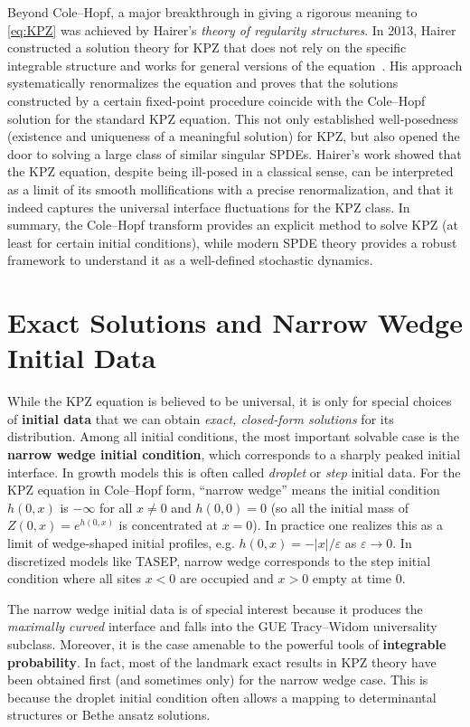\documentclass[letterpaper,11pt,oneside,reqno]{article}
\numberwithin{equation}{section}
\theoremstyle{definition}
\begin{document}
Beyond Cole–Hopf, a major breakthrough in giving a rigorous meaning to \eqref{eq:KPZ} was achieved by Hairer’s \emph{theory of regularity structures}. In 2013, Hairer constructed a solution theory for KPZ that does not rely on the specific integrable structure and works for general versions of the equation \cite{Hairer11}. His approach systematically renormalizes the equation and proves that the solutions constructed by a certain fixed-point procedure coincide with the Cole–Hopf solution for the standard KPZ equation. This not only established well-posedness (existence and uniqueness of a meaningful solution) for KPZ, but also opened the door to solving a large class of similar singular SPDEs. Hairer’s work showed that the KPZ equation, despite being ill-posed in a classical sense, can be interpreted as a limit of its smooth mollifications with a precise renormalization, and that it indeed captures the universal interface fluctuations for the KPZ class. In summary, the Cole–Hopf transform provides an explicit method to solve KPZ (at least for certain initial conditions), while modern SPDE theory provides a robust framework to understand it as a well-defined stochastic dynamics.

\section{Exact Solutions and Narrow Wedge Initial Data}
While the KPZ equation is believed to be universal, it is only for special choices of \textbf{initial data} that we can obtain \emph{exact, closed-form solutions} for its distribution. Among all initial conditions, the most important solvable case is the \textbf{narrow wedge initial condition}, which corresponds to a sharply peaked initial interface. In growth models this is often called \emph{droplet} or \emph{step} initial data. For the KPZ equation in Cole–Hopf form, “narrow wedge” means the initial condition $h(0,x)$ is $-\infty$ for all $x\neq 0$ and $h(0,0)=0$ (so all the initial mass of $Z(0,x)=e^{h(0,x)}$ is concentrated at $x=0$). In practice one realizes this as a limit of wedge-shaped initial profiles, e.g. $h(0,x) = -|x|/\varepsilon$ as $\varepsilon\to0$. In discretized models like TASEP, narrow wedge corresponds to the step initial condition where all sites $x<0$ are occupied and $x>0$ empty at time $0$.

The narrow wedge initial data is of special interest because it produces the \emph{maximally curved} interface and falls into the GUE Tracy–Widom universality subclass. Moreover, it is the case amenable to the powerful tools of \textbf{integrable probability}. In fact, most of the landmark exact results in KPZ theory have been obtained first (and sometimes only) for the narrow wedge case. This is because the droplet initial condition often allows a mapping to determinantal structures or Bethe ansatz solutions.
\end{document}
